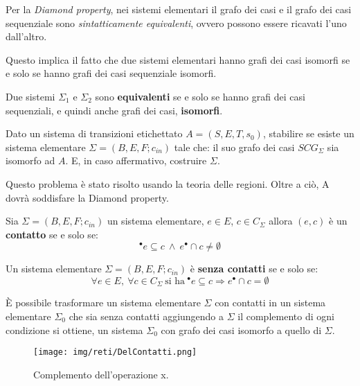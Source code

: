 Per la \textit{Diamond property}, nei sistemi elementari il grafo dei casi e il
grafo dei casi sequenziale sono \textit{sintatticamente equivalenti}, ovvero
possono essere ricavati l'uno dall'altro.

Questo implica il fatto che due sistemi elementari hanno grafi dei casi isomorfi
se e solo se hanno grafi dei casi sequenziale isomorfi.
\begin{definizione}
    Due sistemi $\Sigma_1$ e $\Sigma_2$ sono \textbf{equivalenti} se e solo se
    hanno grafi dei casi sequenziali, e quindi anche grafi dei casi, \textbf{isomorfi}.
\end{definizione}
\begin{definizione}
    Dato un sistema di transizioni etichettato $A = (S, E,T,s_0)$, stabilire se
    esiste un sistema elementare $\Sigma = (B, E, F; c_{in})$ tale che: il suo
    grafo dei casi $SCG_{\Sigma}$ sia isomorfo ad $A$. E, in caso affermativo,
    costruire $\Sigma$.

    Questo problema è stato risolto usando la teoria delle regioni. Oltre a ciò,
    A dovrà soddisfare la Diamond property.
\end{definizione}
\begin{definizione}
    Sia $\Sigma = (B, E, F; c_{in})$ un sistema elementare, $e \in E$, $c \in
        C_{\Sigma}$ allora $(e, c)$ è un \textbf{contatto} se e solo se:
    \begin{equation}
        ^{\bullet}e \subseteq c \ \land \ e^{\bullet} \cap c \neq \emptyset
    \end{equation}
\end{definizione}
\begin{definizione}
    Un sistema elementare $\Sigma = (B, E, F; c_{in})$ è \textbf{senza contatti}
    se e solo se:
    \begin{equation}
        \forall e \in E, \ \forall c \in C_{\Sigma} \ \text{si ha} \ ^{\bullet}e
        \subseteq c \Rightarrow e^{\bullet} \cap c = \emptyset
    \end{equation}
\end{definizione}
È possibile trasformare un sistema elementare $\Sigma$ con contatti in un
sistema elementare $\Sigma_0$ che sia senza contatti aggiungendo a $\Sigma$ il
complemento di ogni condizione si ottiene, un sistema $\Sigma_0$ con grafo dei
casi isomorfo a quello di $\Sigma$.
\begin{figure}[!ht]
    \centering
    \texttt{[image: img/reti/DelContatti.png]}
    \caption{Complemento dell'operazione x.}
\end{figure}
